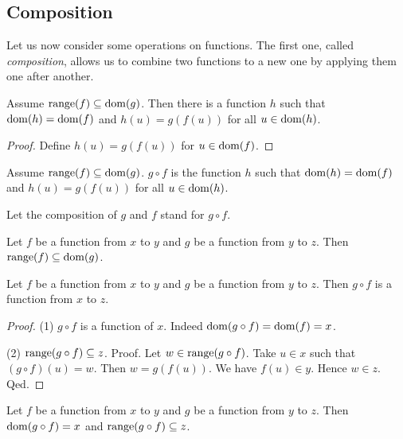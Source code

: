 \documentclass[../../set-theory.ftl.tex]{subfiles}
\begin{document}
  \subsection{Composition}

  Let us now consider some operations on functions.
  The first one, called \textit{composition}, allows us to combine two functions
  to a new one by applying them one after another.

  \begin{forthel}
    \begin{lemma}
      Assume $\operatorname{range}(f) \subseteq \operatorname{dom}(g)$.
      Then there is a function $h$ such that $\operatorname{dom}(h) = \operatorname{dom}(f)$ and $h(u) = g(f(u))$ for all $u \in \operatorname{dom}(h)$.
    \end{lemma}
    \begin{proof}
      Define $h(u) = g(f(u))$ for $u \in \operatorname{dom}(f)$.
    \end{proof}

    \begin{definition}
      Assume $\operatorname{range}(f) \subseteq \operatorname{dom}(g)$.
      $g \circ f$ is the function $h$ such that $\operatorname{dom}(h) = \operatorname{dom}(f)$ and $h(u) = g(f(u))$ for all $u \in \operatorname{dom}(h)$.
    \end{definition}

    Let the composition of $g$ and $f$ stand for $g \circ f$.

    \begin{lemma}
      Let $f$ be a function from $x$ to $y$ and $g$ be a function from $y$ to $z$.
      Then $\operatorname{range}(f) \subseteq \operatorname{dom}(g)$.
    \end{lemma}

    \begin{proposition}\label{SetTheory_02_01_289732}
      Let $f$ be a function from $x$ to $y$ and $g$ be a function from $y$ to $z$.
      Then $g \circ f$ is a function from $x$ to $z$.
    \end{proposition}
    \begin{proof}
      (1) $g \circ f$ is a function of $x$.
      Indeed $\operatorname{dom}(g \circ f) = \operatorname{dom}(f) = x$.

      (2) $\operatorname{range}(g \circ f) \subseteq z$.
      Proof.
        Let $w \in \operatorname{range}(g \circ f)$.
        Take $u \in x$ such that $(g \circ f)(u) = w$.
        Then $w = g(f(u))$.
        We have $f(u) \in y$.
        Hence $w \in z$.
      Qed.
    \end{proof}

    \begin{lemma}
      Let $f$ be a function from $x$ to $y$ and $g$ be a function from $y$ to $z$.
      Then $\operatorname{dom}(g \circ f) = x$ and $\operatorname{range}(g \circ f) \subseteq z$.
    \end{lemma}


\end{forthel}
\end{document}
